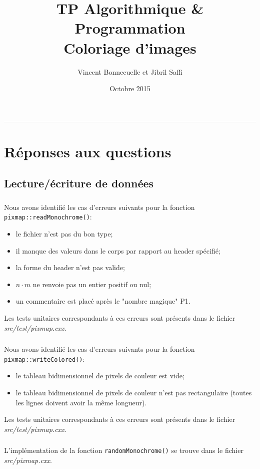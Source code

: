 \documentclass[10pt,a4paper]{article}
\title{\textbf{TP Algorithmique \& Programmation} \\ Coloriage d'images}
\author{Vincent Bonnecuelle et Jibril Saffi}
\date{Octobre 2015}
\begin{document}
\maketitle
\hrule
\section*{Réponses aux questions}
\subsection{Lecture/écriture de données}
\subsubsection{} 
Nous avons identifié les cas d'erreurs suivants pour la fonction \texttt{pixmap::readMonochrome()}:
\begin{itemize}
\itemsep0em 
\item le fichier n'est pas du bon type;
\item il manque des valeurs dans le corps par rapport au header spécifié;
\item la forme du header n'est pas valide;
\item $n \cdot{m}$ ne renvoie pas un entier positif ou nul;
\item un commentaire est placé après le "nombre magique" P1.
\end{itemize}
Les tests unitaires correspondants à ces erreurs sont présents dans le fichier \textit{src/test/pixmap.cxx}.

\subsubsection{} 
Nous avons identifié les cas d'erreurs suivants pour la fonction \texttt{pixmap::writeColored()}:
\begin{itemize}
\itemsep0em 
\item le tableau bidimensionnel de pixels de couleur est vide;
\item le tableau bidimensionnel de pixels de couleur n'est pas rectangulaire (toutes les lignes doivent avoir la même longueur).
\end{itemize}
Les tests unitaires correspondants à ces erreurs sont présents dans le fichier \textit{src/test/pixmap.cxx}.

\subsubsection{}
L'implémentation de la fonction \texttt{randomMonochrome()} se trouve dans le fichier \textit{src/pixmap.cxx}.
\clearpage
\end{document}
